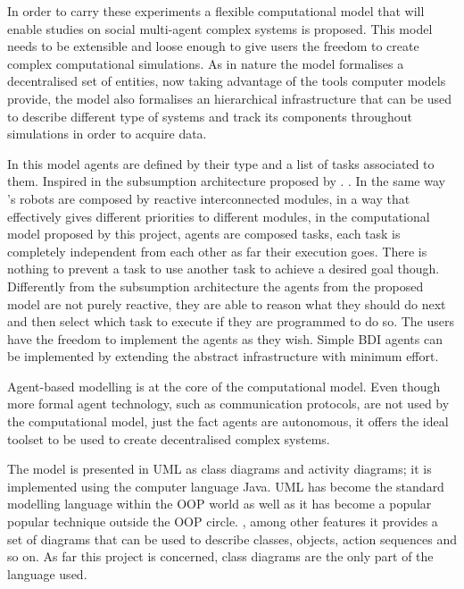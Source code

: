 In order to carry these experiments a flexible computational model that will enable studies on social multi-agent complex systems is proposed. This model needs to be extensible and loose enough to give users the freedom to create complex computational simulations. As in nature the model formalises a decentralised set of entities, now taking advantage of the tools computer models provide, the model also formalises an hierarchical infrastructure that can be used to describe different type of systems and track its components throughout simulations in order to acquire data.
 
In this model agents are defined by their type and a list of tasks associated to them. Inspired in the subsumption architecture proposed by \citeauthor{1087032}. \cite{1087032} \cite{Brooks1986b}. In the same way \citeauthor{1087032}'s robots are composed by reactive interconnected modules, in a way that effectively gives different priorities to different modules, in the computational model proposed by this project, agents are composed tasks, each task is completely independent from each other as far their execution goes. There is nothing to prevent a task to use another task to achieve a desired goal though. Differently from the subsumption architecture the agents from the proposed model are not purely reactive, they are able to reason what they should do next and then select which task to execute if they are programmed to do so. The users have the freedom to implement the agents as they wish. Simple BDI \cite{bratman1999intention} \cite{wooldridge2009introduction} agents can be implemented by extending the abstract infrastructure with minimum effort.

Agent-based modelling is at the core of the computational model. Even though more formal agent technology, such as communication protocols, are not used by the computational model, just the fact agents are autonomous, it offers the ideal toolset to be used to create decentralised complex systems.

The model is presented in UML as class diagrams and activity diagrams; it is implemented using the computer language Java. UML has become the standard modelling language within the OOP world as well as it has become a popular popular technique outside the OOP circle. \cite{fowler2004uml}, among other features it provides a set of diagrams that can be used to describe classes, objects, action sequences and so on. As far this project is concerned, class diagrams are the only part of the language used.

